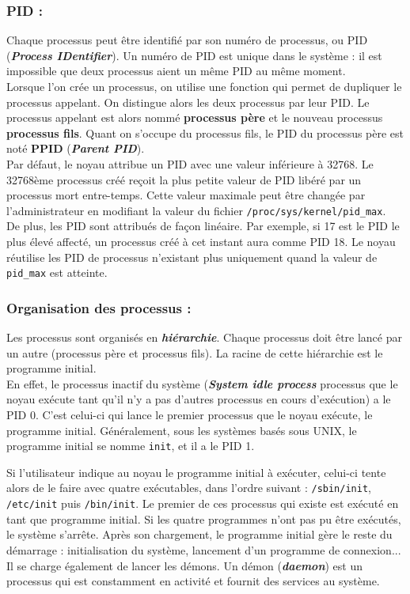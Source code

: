 		\subsubsection*{PID :}
			Chaque processus peut être identifié par son numéro de processus, ou PID (\textbf{\textit{Process IDentifier}}). Un numéro de PID est unique dans le système : il est impossible que deux processus aient un même PID au même moment.\\
			Lorsque l'on crée un processus, on utilise une fonction qui permet de dupliquer le processus appelant. On distingue alors les deux processus par leur PID. Le processus appelant est alors nommé \textbf{processus père} et le nouveau processus \textbf{processus fils}. Quant on s'occupe du processus fils, le PID du processus père est noté \textbf{PPID} (\textbf{\textit{Parent PID}}).\\
			
			Par défaut, le noyau attribue un PID avec une valeur inférieure à 32768. Le 32768ème processus créé reçoit la plus petite valeur de PID libéré par un processus mort entre-temps. Cette valeur maximale peut être changée par l'administrateur en modifiant la valeur du fichier \lstinline!/proc/sys/kernel/pid_max!.\\
			De plus, les PID sont attribués de façon linéaire. Par exemple, si 17 est le PID le plus élevé affecté, un processus créé à cet instant aura comme PID 18. Le noyau réutilise les PID de processus n'existant plus uniquement quand la valeur de \lstinline!pid_max! est atteinte.
			
		\subsubsection*{Organisation des processus :}
			Les processus sont organisés en \textbf{\textit{hiérarchie}}. Chaque processus doit être lancé par un autre (processus père et processus fils). La racine de cette hiérarchie est le programme initial.\\ 
			En effet, le processus inactif du système (\textbf{\textit{System idle process}} processus que le noyau exécute tant qu'il n'y a pas d'autres processus en cours d'exécution) a le PID 0. C'est celui-ci qui lance le premier processus que le noyau exécute, le programme initial. Généralement, sous les systèmes basés sous UNIX, le programme initial se nomme \lstinline!init!, et il a le PID 1.
			
			Si l'utilisateur indique au noyau le programme initial à exécuter, celui-ci tente alors de le faire avec quatre exécutables, dans l'ordre suivant : \lstinline!/sbin/init!, \lstinline!/etc/init! puis \lstinline!/bin/init!. Le premier de ces processus qui existe est exécuté en tant que programme initial. Si les quatre programmes n'ont pas pu être exécutés, le système s'arrête. Après son chargement, le programme initial gère le reste du démarrage : initialisation du système, lancement d'un programme de connexion... Il se charge également de lancer les démons. Un démon (\textbf{\textit{daemon}}) est un processus qui est constamment en activité et fournit des services au système.

